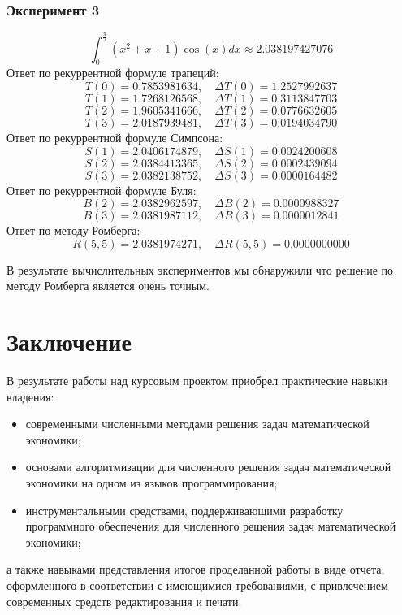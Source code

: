 \documentclass[14pt, titlepage, a4paper]{extarticle} %
\begin{document}
	\subsubsection*{Эксперимент 3}
	
	\[\int_{0}^{\frac{\pi}{2}}\left(x^2 + x + 1\right)\cos(x)dx \approx 2.038197427076\]
	Ответ по рекуррентной формуле трапеций:
	\[T(0) = 0.7853981634,\quad \Delta T(0) = 1.2527992637\]
	\[T(1) = 1.7268126568,\quad \Delta T(1) = 0.3113847703\]
	\[T(2) = 1.9605341666,\quad \Delta T(2) = 0.0776632605\]
	\[T(3) = 2.0187939481,\quad \Delta T(3) = 0.0194034790\]
	Ответ по рекуррентной формуле Симпсона:
	\[S(1) = 2.0406174879,\quad \Delta S(1) = 0.0024200608\]
	\[S(2) = 2.0384413365,\quad \Delta S(2) = 0.0002439094\]
	\[S(3) = 2.0382138752,\quad \Delta S(3) = 0.0000164482\]
	Ответ по рекуррентной формуле Буля:
	\[B(2) = 2.0382962597,\quad \Delta B(2) = 0.0000988327\]
	\[B(3) = 2.0381987112,\quad \Delta B(3) = 0.0000012841\]
	Ответ по методу Ромберга:
	\[R(5, 5) = 2.0381974271,\quad \Delta R(5,5) = 0.0000000000\]
	
	В результате вычислительных экспериментов мы обнаружили что решение по методу Ромберга является очень точным.
	
	
	\section*{Заключение}
	
	В результате работы над курсовым проектом приобрел практические навыки владения:
	\begin{itemize}
		\item современными численными методами решения задач математической экономики;
		\item основами алгоритмизации для численного решения задач математической экономики на одном из языков программирования;
		\item инструментальными средствами, поддерживающими разработку программного обеспечения для численного решения задач математической экономики; 
	\end{itemize}
	а также навыками представления итогов проделанной работы в виде отчета, оформленного в соответствии с имеющимися требованиями, с привлечением современных средств редактирования и печати.
	
\end{document}
